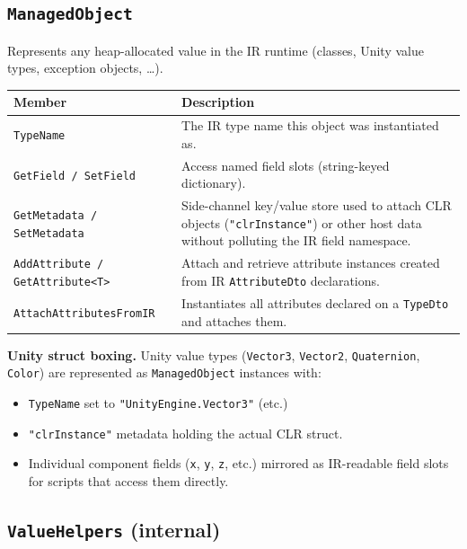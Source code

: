 \documentclass[11pt,a4paper]{article}
\newcommand{\code}[1]{\texttt{\small #1}}
\newcommand{\typename}[1]{\textcolor{typecolor}{\texttt{\small #1}}}
\begin{document}
\subsection{\texttt{ManagedObject}}

Represents any heap-allocated value in the IR runtime (classes, Unity value types,
exception objects, \ldots).

\begin{longtable}{lp{9cm}}
  \toprule
  \textbf{Member} & \textbf{Description} \\
  \midrule
  \endhead
  \code{TypeName}                     & The IR type name this object was instantiated as. \\
  \code{GetField / SetField}          & Access named field slots (string-keyed dictionary). \\
  \code{GetMetadata / SetMetadata}    & Side-channel key/value store used to attach CLR
                                        objects (\code{"clrInstance"}) or other host data
                                        without polluting the IR field namespace. \\
  \code{AddAttribute / GetAttribute<T>} & Attach and retrieve attribute instances created
                                          from IR \typename{AttributeDto} declarations. \\
  \code{AttachAttributesFromIR}       & Instantiates all attributes declared on a
                                        \typename{TypeDto} and attaches them. \\
  \bottomrule
\end{longtable}

\textbf{Unity struct boxing.} Unity value types (\typename{Vector3},
\typename{Vector2}, \typename{Quaternion}, \typename{Color}) are represented as
\typename{ManagedObject} instances with:

\begin{itemize}[leftmargin=2em]
  \item \code{TypeName} set to \texttt{"UnityEngine.Vector3"} (etc.)
  \item \code{"clrInstance"} metadata holding the actual CLR struct.
  \item Individual component fields (\code{x}, \code{y}, \code{z}, etc.) mirrored
        as IR-readable field slots for scripts that access them directly.
\end{itemize}

\subsection{\texttt{ValueHelpers} (internal)}
\end{document}
